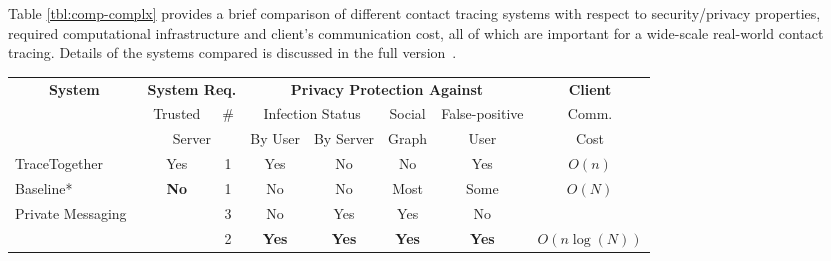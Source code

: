 Table \ref{tbl:comp-complx} provides a brief comparison of different contact tracing systems with respect to security/privacy properties, required computational infrastructure and client's communication cost, all of which are important for a wide-scale real-world contact tracing. Details of the systems compared is discussed in the full version~\cite{epione}.


\begin{table}[]
	\footnotesize
	\centering
	\begin{tabular}{|l||c|c|c|c|c|c|c|}
		\hline
		\multicolumn{1}{|c|}{\multirow{3}{*}{\textbf{System}}}                        & \multicolumn{2}{c|}{\textbf{System Req.}}                 & \multicolumn{4}{c|}{\textbf{Privacy Protection Against}}                      & \textbf{Client}             \\ 
		\multicolumn{1}{|c|}{}                                               & Trusted                      & \# & \multicolumn{2}{c|}{Infection Status} & Social & False-positive       & Comm.                \\ 
		\multicolumn{1}{|c|}{}                                      & \multicolumn{2}{c|}{Server}                                               & By User          & By Server  & Graph           & User          & Cost                   \\ \hline \hline
		TraceTogether~\cite{ttg}                                                        & Yes                          & 1                         & Yes              & No & No              & Yes                       & $O(n)$     \\ \cline{1-8}
		Baseline*                 & \multirow{3}{*}{\textbf{No}} & 1                         & No               & No     & Most          & Some                      & \multirow{2}{*}{$O(N)$} \\ \cline{1-1} \cline{3-7} 
		
		Private Messaging~\cite{cho2020contact} &                              & 3                         & No               & Yes   & Yes         & No                      &                    \\ \cline{1-1} \cline{3-7}\cline{8-8}
		
		\dect                                                 &                              & 2                      &   \textbf{Yes}    & \textbf{Yes} & \textbf{Yes}   & \textbf{Yes}   &  $O(n\log(N))$   \\ \hline
	\end{tabular}
	

\end{table}
